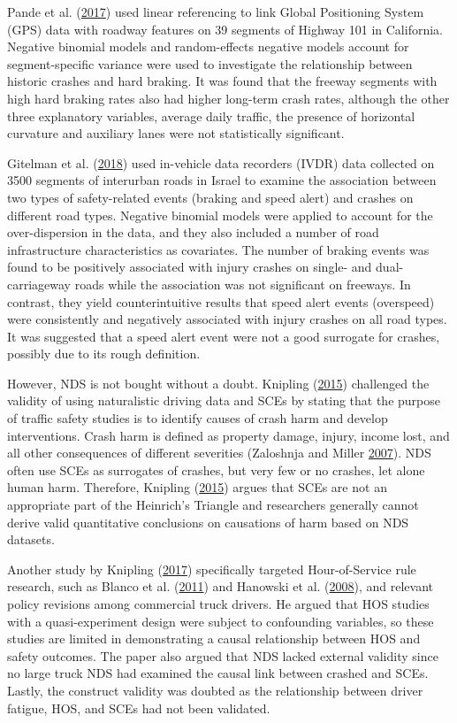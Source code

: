 \documentclass[12pt]{book}
\numberwithin{equation}{chapter}
\begin{document}
Pande et al. (\protect\hyperlink{ref-pande2017preliminary}{2017}) used linear referencing to link Global Positioning System (GPS) data with roadway features on 39 segments of Highway 101 in California. Negative binomial models and random-effects negative models account for segment-specific variance were used to investigate the relationship between historic crashes and hard braking. It was found that the freeway segments with high hard braking rates also had higher long-term crash rates, although the other three explanatory variables, average daily traffic, the presence of horizontal curvature and auxiliary lanes were not statistically significant.

Gitelman et al. (\protect\hyperlink{ref-gitelman2018exploring}{2018}) used in-vehicle data recorders (IVDR) data collected on 3500 segments of interurban roads in Israel to examine the association between two types of safety-related events (braking and speed alert) and crashes on different road types. Negative binomial models were applied to account for the over-dispersion in the data, and they also included a number of road infrastructure characteristics as covariates. The number of braking events was found to be positively associated with injury crashes on single- and dual-carriageway roads while the association was not significant on freeways. In contrast, they yield counterintuitive results that speed alert events (overspeed) were consistently and negatively associated with injury crashes on all road types. It was suggested that a speed alert event were not a good surrogate for crashes, possibly due to its rough definition.

However, NDS is not bought without a doubt. Knipling (\protect\hyperlink{ref-knipling2015naturalistic}{2015}) challenged the validity of using naturalistic driving data and SCEs by stating that the purpose of traffic safety studies is to identify causes of crash harm and develop interventions. Crash harm is defined as property damage, injury, income lost, and all other consequences of different severities (Zaloshnja and Miller \protect\hyperlink{ref-zaloshnja2007unit}{2007}). NDS often use SCEs as surrogates of crashes, but very few or no crashes, let alone human harm. Therefore, Knipling (\protect\hyperlink{ref-knipling2015naturalistic}{2015}) argues that SCEs are not an appropriate part of the Heinrich's Triangle and researchers generally cannot derive valid quantitative conclusions on causations of harm based on NDS datasets.

Another study by Knipling (\protect\hyperlink{ref-knipling2017threats}{2017}) specifically targeted Hour-of-Service rule research, such as Blanco et al. (\protect\hyperlink{ref-blanco2011impact}{2011}) and Hanowski et al. (\protect\hyperlink{ref-hanowski2008analysis}{2008}), and relevant policy revisions among commercial truck drivers. He argued that HOS studies with a quasi-experiment design were subject to confounding variables, so these studies are limited in demonstrating a causal relationship between HOS and safety outcomes. The paper also argued that NDS lacked external validity since no large truck NDS had examined the causal link between crashed and SCEs. Lastly, the construct validity was doubted as the relationship between driver fatigue, HOS, and SCEs had not been validated.
\end{document}
